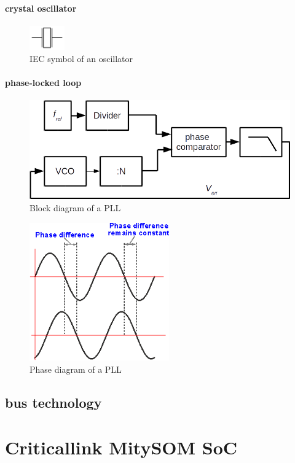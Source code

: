 \paragraph{crystal oscillator}

\begin{figure}[htbp]
\begin{center}
\includegraphics[width=1.5cm,keepaspectratio=true]{bilder/png/crystaloscillatorsymbol}
\caption{IEC symbol of an oscillator}
\label{fig:crystaloscillatorsymbol}
\end{center}
\end{figure}
\paragraph{phase-locked loop}
\begin{figure}[htbp]
\begin{center}
\includegraphics[width=12cm,keepaspectratio=true]{bilder/png/PLLblocks}
\caption{Block diagram of a PLL}
\label{fig:pllblocks}
\end{center}
\end{figure}
\begin{figure}[htbp]
\begin{center}
\includegraphics[width=6cm,keepaspectratio=true]{bilder/png/PLLphase}
\caption{Phase diagram of a PLL}
\label{fig:pllphase}
\end{center}
\end{figure}

\subsection{bus technology}

\section{Criticallink MitySOM SoC}
